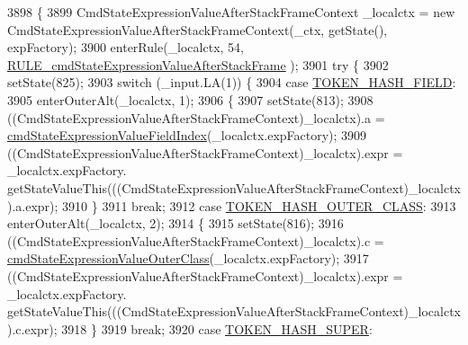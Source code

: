 \begin{DoxyCode}
3898                                                                                                            
                                                         \{
3899     CmdStateExpressionValueAfterStackFrameContext \_localctx = \textcolor{keyword}{new} 
      CmdStateExpressionValueAfterStackFrameContext(\_ctx, getState(), expFactory);
3900     enterRule(\_localctx, 54, \hyperlink{classgov_1_1nasa_1_1jpf_1_1inspector_1_1server_1_1expression_1_1parser_1_1_expression_grammar_parser_ae1e433d6d6100c23286a2f0e913b264c}{RULE\_cmdStateExpressionValueAfterStackFrame}
      );
3901     \textcolor{keywordflow}{try} \{
3902       setState(825);
3903       \textcolor{keywordflow}{switch} (\_input.LA(1)) \{
3904       \textcolor{keywordflow}{case} \hyperlink{classgov_1_1nasa_1_1jpf_1_1inspector_1_1server_1_1expression_1_1parser_1_1_expression_grammar_parser_aa45b2e743ef219e476dfc39c577391f3}{TOKEN\_HASH\_FIELD}:
3905         enterOuterAlt(\_localctx, 1);
3906         \{
3907         setState(813);
3908         ((CmdStateExpressionValueAfterStackFrameContext)\_localctx).a = 
      \hyperlink{classgov_1_1nasa_1_1jpf_1_1inspector_1_1server_1_1expression_1_1parser_1_1_expression_grammar_parser_a300497ebff4ec0759e1a294e9d6a7920}{cmdStateExpressionValueFieldIndex}(\_localctx.expFactory);
3909          ((CmdStateExpressionValueAfterStackFrameContext)\_localctx).expr =  \_localctx.expFactory.
      getStateValueThis(((CmdStateExpressionValueAfterStackFrameContext)\_localctx).a.expr); 
3910         \}
3911         \textcolor{keywordflow}{break};
3912       \textcolor{keywordflow}{case} \hyperlink{classgov_1_1nasa_1_1jpf_1_1inspector_1_1server_1_1expression_1_1parser_1_1_expression_grammar_parser_aefee9e9c56459dd1e9ef51310172faa1}{TOKEN\_HASH\_OUTER\_CLASS}:
3913         enterOuterAlt(\_localctx, 2);
3914         \{
3915         setState(816);
3916         ((CmdStateExpressionValueAfterStackFrameContext)\_localctx).c = 
      \hyperlink{classgov_1_1nasa_1_1jpf_1_1inspector_1_1server_1_1expression_1_1parser_1_1_expression_grammar_parser_a3cb4602fb37c47251dc62b7e1d7c9f0c}{cmdStateExpressionValueOuterClass}(\_localctx.expFactory);
3917          ((CmdStateExpressionValueAfterStackFrameContext)\_localctx).expr =  \_localctx.expFactory.
      getStateValueThis(((CmdStateExpressionValueAfterStackFrameContext)\_localctx).c.expr); 
3918         \}
3919         \textcolor{keywordflow}{break};
3920       \textcolor{keywordflow}{case} \hyperlink{classgov_1_1nasa_1_1jpf_1_1inspector_1_1server_1_1expression_1_1parser_1_1_expression_grammar_parser_a38960ebfcc4708bdf542ce8956dedbbe}{TOKEN\_HASH\_SUPER}:

\end{DoxyCode}
